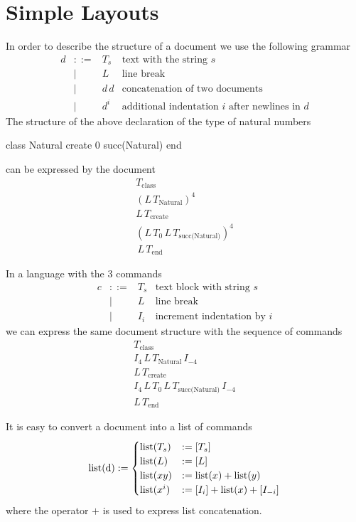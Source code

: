 \documentclass[12pt]{article}
\def\class{\text{class}}
\def\create{\text{create}}
\def\kwend{\text{end}}
\def\Natural{\text{Natural}}
\begin{document}
\section{Simple Layouts}

In order to describe the structure of a document we use the following grammar
$$
\begin{array}{llll}
  d &::=& T_s      & \text{text with the string } s
  \\
    & \mid & L     & \text{line break}
  \\
    & \mid & d\, d & \text{concatenation of two documents}
  \\
    & \mid & d^i   & \text{additional indentation $i$ after newlines in } d
\end{array}
$$%
%
The structure of the above declaration of the type of natural numbers
\begin{alba}
    class
        Natural
    create
        0
        succ(Natural)
    end
\end{alba}
%
can be expressed by the document
$$
\begin{array}{l}
  T_\class \,
  \\
  (L \, T_\Natural)^4 \, \\
  L \, T_\create \, \\
  (L \, T_0 \, L \, T_\text{succ(Natural)})^4 \\
  \, L \, T_\text{end}
\end{array}
$$%

In a language with the 3 commands
$$
\begin{array}{llll}
  c & ::= & T_s         & \text{text block with string } s
  \\
    & \mid &  L         & \text{line break}
  \\
    & \mid &  I_i     & \text{increment indentation by } i
\end{array}
$$%
we can express the same document structure with the sequence of commands
$$
\begin{array}{l}
  T_\class\, \\
  I_4\, L\, T_\Natural\, I_{-4}\, \\
  L\, T_\create\, \\
  I_4\, L\, T_0\, L\, T_\text{succ(Natural)}\, I_{-4} \\
  L\, T_\kwend
\end{array}
$$

It is easy to convert a document into a list of commands
{\def\coms{\text{list}}
  $$
  \text{\coms(d)} :=
  \begin{cases}
    \coms(T_s) &:= [T_s]
    \\
    \coms(L) &:= [L]
    \\
    \coms(x y) &:= \coms(x) + \coms(y)
    \\
    \coms(x^i) &:= [I_i] + \coms(x) + [I_{-i}]
  \end{cases}
  $$
}
where the operator $+$ is used to express list concatenation.
\end{document}
